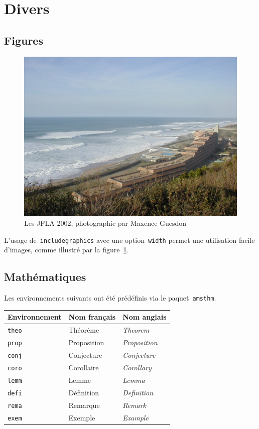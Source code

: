 \documentclass{jflart}
\begin{document}
\section{Divers}

\subsection{Figures}

\begin{figure}
  \centering
  \includegraphics[width=.8\linewidth]{jfla.jpg}
  \caption{Les JFLA 2002, photographie par Maxence Guesdon}
  \label{fig:bienbelle}
\end{figure}

L'usage de~\texttt{includegraphics} avec une option~\texttt{width} permet une
utilisation facile d'images, comme illustré par la figure~\ref{fig:bienbelle}.

\subsection{Mathématiques}

Les environnements suivants ont été prédéfinis via le paquet~\texttt{amsthm}.

\begin{center}
  \begin{tabular}{lll}
    Environnement & Nom français & Nom anglais
    \\
    \hline
    \texttt{theo} & Théorème & \emph{Theorem}
    \\
    \texttt{prop} & Proposition & \emph{Proposition}
    \\
    \texttt{conj} & Conjecture & \emph{Conjecture}
    \\
    \texttt{coro} & Corollaire & \emph{Corollary}
    \\
    \texttt{lemm} & Lemme & \emph{Lemma}
    \\
    \texttt{defi} & Définition & \emph{Definition}
    \\
    \texttt{rema} & Remarque & \emph{Remark}
    \\
    \texttt{exem} & Exemple & \emph{Example}
  \end{tabular}
\end{center}
\end{document}
